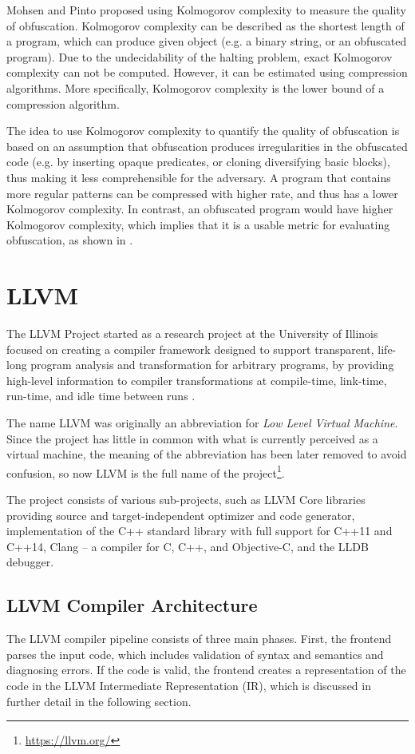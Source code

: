 \documentclass[
  digital, %
  notable,   %
  twoside, %
  nolof,     %
  nolot,     %
]{fithesis3}
\theoremstyle{definition}
\begin{document}
Mohsen and Pinto \cite{eval2016} proposed using Kolmogorov complexity \cite{Kolmogorov1998} to measure the quality of obfuscation. Kolmogorov complexity can be described as the shortest length of a program, which can produce given object (e.g. a binary string, or an obfuscated program). Due to the undecidability of the halting problem, exact Kolmogorov complexity can not be computed. However, it can be estimated using compression algorithms. More specifically, Kolmogorov complexity is the lower bound of a compression algorithm.  

The idea to use Kolmogorov complexity to quantify the quality of obfuscation is based on an assumption that obfuscation produces irregularities in the obfuscated code (e.g. by inserting opaque predicates, or cloning diversifying basic blocks), thus making it less comprehensible for the adversary. A program that contains more regular patterns can be compressed with higher rate, and thus has a lower Kolmogorov complexity. In contrast, an obfuscated program would have higher Kolmogorov complexity, which implies that it is a usable metric for evaluating obfuscation, as shown in \cite{Kolmogorov1998}. 

\chapter{LLVM}

The LLVM Project started as a research project at the University of Illinois focused on creating a compiler framework designed to support transparent, life-long program analysis and transformation for arbitrary programs, by providing high-level information to compiler transformations at compile-time, link-time, run-time, and idle time between runs \cite{llvm_orig}. 

The name LLVM was originally an abbreviation for \textit{Low Level Virtual Machine}. Since the project has little in common with what is currently perceived as a virtual machine, the meaning of the abbreviation has been later removed to avoid confusion, so now LLVM is the full name of the project\footnote{\url{https://llvm.org/}}.

The project consists of various sub-projects, such as LLVM Core libraries providing source and target-independent optimizer and code generator, implementation of the C++ standard library with full support for C++11 and C++14, Clang -- a compiler for C, C++, and Objective-C, and the LLDB debugger.

\section{LLVM Compiler Architecture}
The LLVM compiler pipeline consists of three main phases. First, the frontend parses the input code, which includes validation of syntax and semantics and diagnosing errors. If the code is valid, the frontend creates a representation of the code in the LLVM Intermediate Representation (IR), which is discussed in further detail in the following section. 
\end{document}
